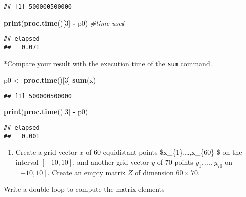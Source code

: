 \documentclass[]{article}
\newenvironment{Shaded}{\begin{snugshade}}{\end{snugshade}}
\newcommand{\KeywordTok}[1]{\textcolor[rgb]{0.13,0.29,0.53}{\textbf{#1}}}
\newcommand{\DecValTok}[1]{\textcolor[rgb]{0.00,0.00,0.81}{#1}}
\newcommand{\StringTok}[1]{\textcolor[rgb]{0.31,0.60,0.02}{#1}}
\newcommand{\CommentTok}[1]{\textcolor[rgb]{0.56,0.35,0.01}{\textit{#1}}}
\newcommand{\OperatorTok}[1]{\textcolor[rgb]{0.81,0.36,0.00}{\textbf{#1}}}
\newcommand{\NormalTok}[1]{#1}
\providecommand{\tightlist}{%
  \setlength{\itemsep}{0pt}\setlength{\parskip}{0pt}}
\begin{document}
\begin{verbatim}
## [1] 500000500000
\end{verbatim}

\begin{Shaded}
\begin{Highlighting}[]
\KeywordTok{print}\NormalTok{(}\KeywordTok{proc.time}\NormalTok{()[}\DecValTok{3}\NormalTok{] }\OperatorTok{-}\StringTok{ }\NormalTok{p0)  }\CommentTok{#time used }
\end{Highlighting}
\end{Shaded}

\begin{verbatim}
## elapsed 
##   0.071
\end{verbatim}

*Compare your result with the execution time of the \texttt{sum}
command.

\begin{Shaded}
\begin{Highlighting}[]
\NormalTok{p0 <-}\StringTok{ }\KeywordTok{proc.time}\NormalTok{()[}\DecValTok{3}\NormalTok{]}
\KeywordTok{sum}\NormalTok{(x)}
\end{Highlighting}
\end{Shaded}

\begin{verbatim}
## [1] 500000500000
\end{verbatim}

\begin{Shaded}
\begin{Highlighting}[]
\KeywordTok{print}\NormalTok{(}\KeywordTok{proc.time}\NormalTok{()[}\DecValTok{3}\NormalTok{] }\OperatorTok{-}\StringTok{ }\NormalTok{p0)}
\end{Highlighting}
\end{Shaded}

\begin{verbatim}
## elapsed 
##   0.001
\end{verbatim}

\begin{enumerate}
\def\labelenumi{\arabic{enumi}.}
\setcounter{enumi}{1}
\tightlist
\item
  Create a grid vector \(x\) of 60 equidistant points
  \$x\_\{1\},\ldots,x\_\{60\} \$ on the interval \([-10,10]\), and
  another grid vector \(y\) of 70 points \(y_{1},\ldots ,y_{70}\) on
  \([-10,10]\). Create an empty matrix \(Z\) of dimension
  \(60\times 70\).
\end{enumerate}

Write a double loop to compute the matrix elements
\end{document}
